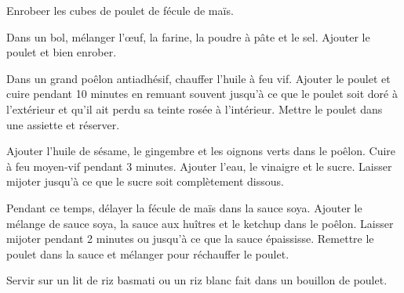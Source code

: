 \begin{steps}
    \item Enrobeer les cubes de poulet de fécule de maïs.
    \item Dans un bol, mélanger l'œuf, la farine, la poudre à pâte et le sel. Ajouter le poulet et bien enrober.
    \item Dans un grand poêlon antiadhésif, chauffer l'huile à feu vif. Ajouter le poulet et cuire pendant 10 minutes en remuant souvent jusqu'à ce que le poulet soit doré à l'extérieur et qu'il ait perdu sa teinte rosée à l'intérieur. Mettre le poulet dans une assiette et réserver.
    \item Ajouter l'huile de sésame, le gingembre et les oignons verts dans le poêlon. Cuire à feu moyen-vif pendant 3 minutes. Ajouter l'eau, le vinaigre et le sucre. Laisser mijoter jusqu'à ce que le sucre soit complètement dissous.
    \item Pendant ce temps, délayer la fécule de maïs dans la sauce soya. Ajouter le mélange de sauce soya, la sauce aux huîtres et le ketchup dans le poêlon. Laisser mijoter pendant 2 minutes ou jusqu'à ce que la sauce épaississe. Remettre le poulet dans la sauce et mélanger pour réchauffer le poulet.
    \item Servir sur un lit de riz basmati ou un riz blanc fait dans un bouillon de poulet.
\end{steps}
